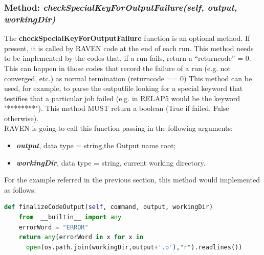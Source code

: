  \subsubsection{Method: \textit{checkSpecialKeyForOutputFailure(self, output, workingDir)}} 
\label{subsubsec:checkSpecialKeyForOutputFailure}
The \textbf{checkSpecialKeyForOutputFailure} function is an optional method. If present, it is called 
by RAVEN code at the end of each run. This method needs to be implemented by the codes that, if a run fails, return a ``returncode'' = 0. 
This can happen in those codes that record the failure of a run (e.g. not converged, etc.) as normal termination (returncode == 0)
This method can be used, for example, to parse the outputfile looking for a special keyword that testifies that a particular job  failed
 (e.g. in RELAP5 would be the keyword "********"). This method MUST return a boolean (True if failed, False otherwise).
\\RAVEN is going to call this function passing in the following arguments:
\begin{itemize}
  \item \textbf{\textit{output}}, data type = string,the Output name root;
  \item  \textbf{\textit{workingDir}}, data type = string, current working directory.
\end{itemize}
For the example referred in the previous section, this method would implemented as follows:
\newline
\begin{lstlisting}[language=python]
def finalizeCodeOutput(self, command, output, workingDir)
    from  __builtin__ import any 
    errorWord = "ERROR"
    return any(errorWord in x for x in 
      open(os.path.join(workingDir,output+'.o'),"r").readlines())
 \end{lstlisting} 
 


